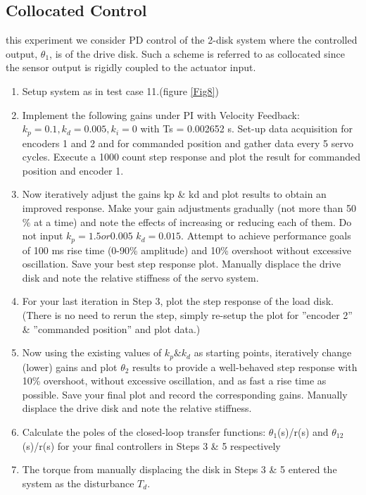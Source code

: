 \documentclass[11pt, a4paper]{article}
\begin{document}
\subsection{Collocated Control}
this experiment we consider PD control of the 2-disk system where the controlled output, $\theta_1$, is of the drive disk. Such a scheme is referred to as collocated since the sensor output is rigidly coupled to the actuator input.
\begin{enumerate}
\item Setup system as in test case 11.(figure \ref{Fig8})
\item Implement the following gains under PI with Velocity Feedback: $k_p = 0.1, k_d = 0.005,k_i = 0$ with Ts = 0.002652 s. Set-up data acquisition for encoders 1 and 2 and for commanded position and gather data every 5 servo cycles. Execute a 1000 count step response and plot the result for commanded position and encoder 1.
\item Now iteratively adjust the gains kp \& kd and plot results to obtain an improved response. Make your gain adjustments gradually (not more than 50$\%$ at a time) and note the effects of increasing or reducing each of them. Do not input $k_p = 1.5 or 0.005$ $k_d = 0.015$. Attempt to achieve performance goals of 100 ms rise time (0-90\% amplitude) and 10\% overshoot without excessive oscillation. Save your best step response plot. Manually displace the drive disk and note the relative stiffness of the servo system.
\item For your last iteration in Step 3, plot the step response of the load disk. (There is no need to rerun the step, simply re-setup the plot for ”encoder 2” \& ”commanded position” and plot data.)
\item Now using the existing values of $k_p \& k_d$ as starting points, iteratively change (lower) gains and plot $\theta_2$ results to provide a well-behaved step response with 10\% overshoot, without excessive oscillation, and as fast a rise time as possible. Save your final plot and record the corresponding gains. Manually displace the drive disk and note the relative stiffness.
\item Calculate the poles of the closed-loop transfer functions: $\theta_1$(s)/r(s) and $\theta_{12}$(s)/r(s) for your final controllers in Steps 3 \& 5 respectively
\item The torque from manually displacing the disk in Steps 3 \& 5 entered the system as the disturbance $T_d$.
\end{enumerate}
\end{document}
